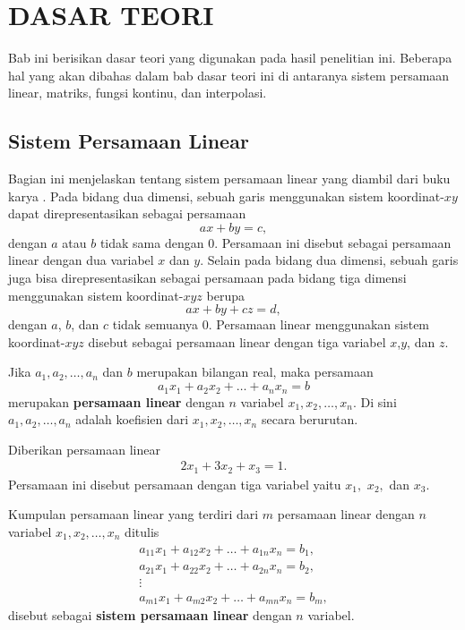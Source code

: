 \chapter{DASAR TEORI}

Bab ini berisikan dasar teori yang digunakan pada hasil penelitian ini. Beberapa hal yang akan dibahas dalam bab dasar teori ini di antaranya sistem persamaan linear, matriks, fungsi kontinu, dan interpolasi.

\section{Sistem Persamaan Linear}

Bagian ini menjelaskan tentang sistem persamaan linear yang diambil dari buku karya \citep{howard}. Pada bidang dua dimensi, sebuah garis menggunakan sistem koordinat-$xy$ dapat direpresentasikan sebagai persamaan
\begin{equation*}
    ax + by = c,
\end{equation*}
dengan $a$ atau $b$ tidak sama dengan 0. Persamaan ini disebut sebagai persamaan linear dengan dua variabel $x$ dan $y$. Selain pada bidang dua dimensi, sebuah garis juga bisa direpresentasikan sebagai persamaan pada bidang tiga dimensi menggunakan sistem koordinat-$xyz$ berupa
\begin{equation*}
    ax + by + cz = d,
\end{equation*}
dengan $a$, $b$, dan $c$ tidak semuanya 0. Persamaan linear menggunakan sistem koordinat-$xyz$ disebut sebagai persamaan linear dengan tiga variabel $x$,$ y$, dan $z$.
\begin{definisi}
    Jika $a_1, a_2, \dots, a_n$ dan $b$ merupakan bilangan real, maka persamaan
    \begin{equation*}    
    a_1x_1 + a_2x_2 + \dots + a_nx_n =b
    \end{equation*}
    merupakan \textbf{persamaan linear} dengan $n$ variabel $x_1, x_2, \dots, x_n$. Di sini $a_1, a_2, \dots, a_n$ adalah koefisien dari $x_1, x_2, \dots, x_n$ secara berurutan.
\end{definisi} 
\begin{contoh}
    Diberikan persamaan linear
    \begin{align*}
        2x_1 + 3x_2 + x_3 = 1.
    \end{align*}
    Persamaan ini disebut persamaan dengan tiga variabel yaitu $x_1,$ $x_2,$ dan $x_3$.
\end{contoh}
\begin{definisi}
    Kumpulan persamaan linear yang terdiri dari $m$ persamaan linear dengan $n$ variabel $x_1, x_2, \dots, x_n$ ditulis
    \begin{gather*}
        a_{11}x_1 + a_{12}x_2 + \dots + a_{1n}x_n =b_1,\\
        a_{21}x_1 + a_{22}x_2 + \dots + a_{2n}x_n =b_2,\\
        \vdots\\
        a_{m1}x_1 + a_{m2}x_2 + \dots + a_{mn}x_n =b_m,
    \end{gather*}
    disebut sebagai \textbf{sistem persamaan linear} dengan $n$ variabel.
\end{definisi}
